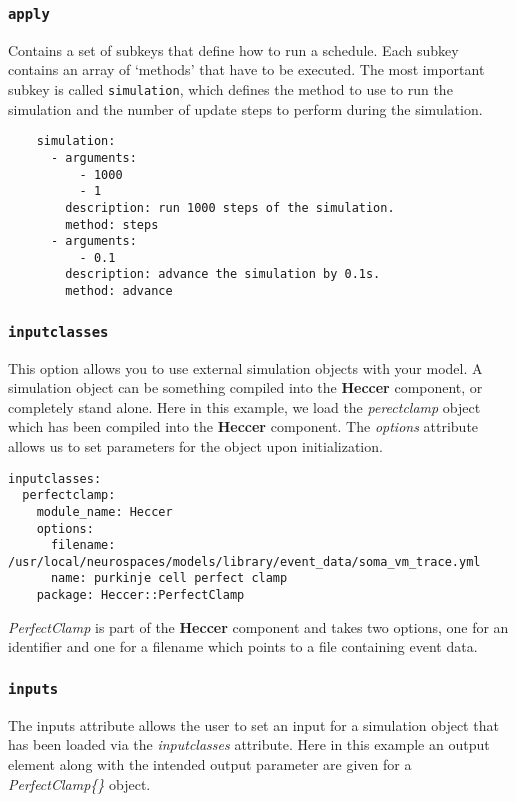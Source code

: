 \documentclass[12pt]{article}
\begin{document}
\subsubsection*{\tt apply}

Contains a set of subkeys that define how to run a schedule. Each subkey contains an array of `methods' that have to be executed. The most important subkey is called {\tt simulation}, which defines the method to use to run the simulation and the number of update steps to perform during the simulation. 
\begin{verbatim}
    simulation:
      - arguments:
          - 1000
          - 1
        description: run 1000 steps of the simulation.
        method: steps
      - arguments:
          - 0.1
        description: advance the simulation by 0.1s.
        method: advance
\end{verbatim}

\subsubsection*{\tt inputclasses}

This option allows you to use external simulation objects with your model. A simulation object can be something compiled into the {\bf Heccer} component, or completely stand alone. Here in this example, we load the {\it perectclamp} object which has been compiled into the {\bf Heccer} component. The {\it options} attribute allows us to set parameters for the object upon initialization. 

\begin{verbatim}
inputclasses:
  perfectclamp:
    module_name: Heccer
    options:
      filename: /usr/local/neurospaces/models/library/event_data/soma_vm_trace.yml
      name: purkinje cell perfect clamp
    package: Heccer::PerfectClamp
\end{verbatim}

{\it PerfectClamp} is part of the {\bf Heccer} component and takes two options, one for an identifier and one for a filename which points to a file containing event data.

\subsubsection*{\tt inputs}

The inputs attribute allows the user to set an input for a simulation object that has been loaded via the {\it inputclasses} attribute. Here in this example an output element along with the intended output parameter are given for a {\it PerfectClamp\{\}} object.
\end{document}
